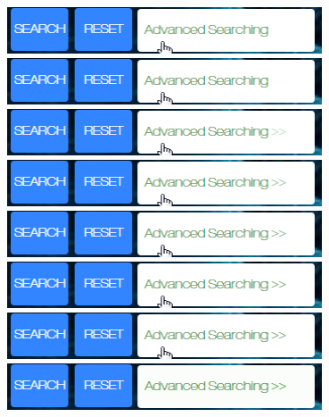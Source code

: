 \documentclass[10pt,twoside,a4paper,titlepage]{article}
\begin{document}
	\newline	
	\includegraphics[width=0.7\textwidth]{cyf/Advanced_searching13.png}
	\newline	
	\includegraphics[width=0.7\textwidth]{cyf/Advanced_searching14.png}
	\newline	
	\includegraphics[width=0.7\textwidth]{cyf/Advanced_searching15.png}
	\newline	
	\includegraphics[width=0.7\textwidth]{cyf/Advanced_searching16.png}
	\newline	
	\includegraphics[width=0.7\textwidth]{cyf/Advanced_searching17.png}
	\newline	
	\includegraphics[width=0.7\textwidth]{cyf/Advanced_searching18.png}
	\newline	
	\includegraphics[width=0.7\textwidth]{cyf/Advanced_searching19.png}
	\newline	
	\includegraphics[width=0.7\textwidth]{cyf/Advanced_searching20.png}
	\newline	
\end{document}
